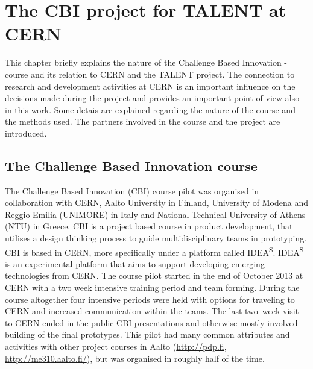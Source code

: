 \documentclass[english,12pt,a4paper,pdftex]{article}
\begin{document}

\clearpage



\section{The CBI project for TALENT at CERN}

This chapter briefly explains the nature of the Challenge Based Innovation -course and its relation to CERN and the TALENT project. The connection to research and development activities at CERN is an important influence on the decisions made during the project and provides an important point of view also in this work. Some detais are explained regarding the nature of the course and the methods used. The partners involved in the course and the project are introduced. 


\subsection{The Challenge Based Innovation course}

The Challenge Based Innovation (CBI) course pilot was organised in collaboration with CERN, Aalto University in Finland, University of Modena and Reggio Emilia (UNIMORE) in Italy and National Technical University of Athens (NTU) in Greece. CBI is a project based course in product development, that utilises a design thinking process to guide multidisciplinary teams in prototyping. CBI is based in CERN, more specifically under a platform called IDEA\textsuperscript{S}. IDEA\textsuperscript{S} is an experimental platform that aims to support developing emerging technologies from CERN. The course pilot started in the end of October 2013 at CERN with a two week intensive training period and team forming. During the course altogether four intensive periods were held with options for traveling to CERN and increased communication within the teams. The last two--week visit to CERN ended in the public CBI presentations and otherwise mostly involved building of the final prototypes. This pilot had many common attributes and activities with other project courses in Aalto (\url{http://pdp.fi}, \url{http://me310.aalto.fi/}), but was organised in roughly half of the time.
\end{document}
